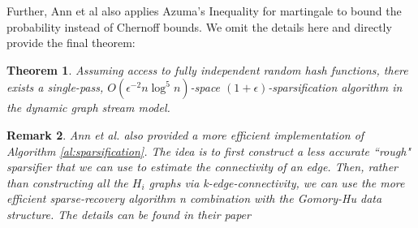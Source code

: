 \documentclass[11pt]{article}
\theoremstyle{plain}
\newtheorem{theorem}{Theorem}[section]
\newtheorem{remark}[theorem]{Remark}
\begin{document}
Further, Ann et al also applies Azuma's Inequality for martingale to bound the 
probability instead of Chernoff bounds. We omit the details here and directly 
provide the final theorem:

\begin{theorem}
Assuming access to fully independent random hash functions, there exists a 
single-pass, $O(\epsilon^{-2}n\log^5 n)$-space
$(1 + \epsilon)$-sparsification algorithm in the dynamic
graph stream model.
\end{theorem}

\begin{remark}
Ann et al. also provided a more efficient implementation of
Algorithm \ref{al:sparsification}. The idea is to first construct
a less accurate “rough" sparsifier that we can use to estimate
the connectivity of an edge. Then, rather than constructing all the
$H_i$ graphs via k-edge-connectivity, we can use the more efficient
sparse-recovery algorithm n combination with the
Gomory-Hu data structure. The details can be found in their paper 
\cite{AGM2012-graph}
\end{remark}










\pagebreak
\appendix


 
\end{document}
